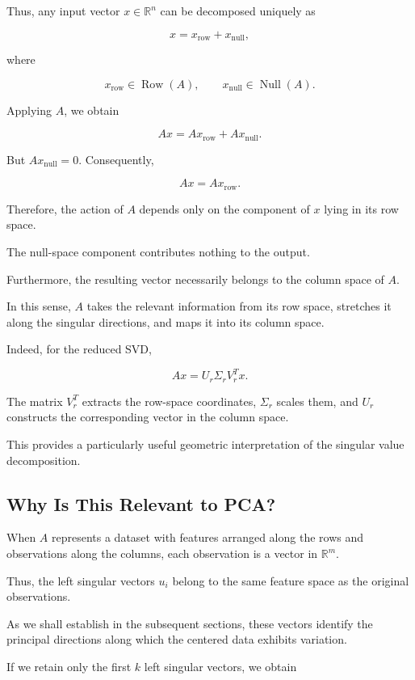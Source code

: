 \documentclass[11pt]{article}
\begin{document}
Thus, any input vector
$x\in\mathbb{R}^n$ can be
decomposed uniquely as

\[
x=x_{\mathrm{row}}+
x_{\mathrm{null}},
\]

where

\[
x_{\mathrm{row}}
\in\operatorname{Row}(A),
\qquad
x_{\mathrm{null}}
\in\operatorname{Null}(A).
\]

Applying $A$, we obtain

\[
Ax
=
Ax_{\mathrm{row}}
+
Ax_{\mathrm{null}}.
\]

But $Ax_{\mathrm{null}}=0$.
Consequently,

\[
\boxed{
Ax=Ax_{\mathrm{row}}.
}
\]

Therefore, the action of $A$
depends only on the component
of $x$ lying in its row space.

The null-space component contributes
nothing to the output.

Furthermore, the resulting vector
necessarily belongs to the column
space of $A$.

In this sense, $A$ takes the relevant
information from its row space,
stretches it along the singular
directions, and maps it into
its column space.

Indeed, for the reduced SVD,

\[
Ax=U_r\Sigma_rV_r^Tx.
\]

The matrix $V_r^T$ extracts
the row-space coordinates,
$\Sigma_r$ scales them,
and $U_r$ constructs the
corresponding vector in
the column space.

This provides a particularly
useful geometric interpretation
of the singular value decomposition.

\subsection{Why Is This Relevant to PCA?}

When $A$ represents a dataset
with features arranged along
the rows and observations
along the columns, each
observation is a vector in
$\mathbb{R}^m$.

Thus, the left singular vectors
$u_i$ belong to the same
feature space as the
original observations.

As we shall establish in
the subsequent sections,
these vectors identify the
principal directions along
which the centered data
exhibits variation.

If we retain only the first
$k$ left singular vectors,
we obtain
\end{document}
